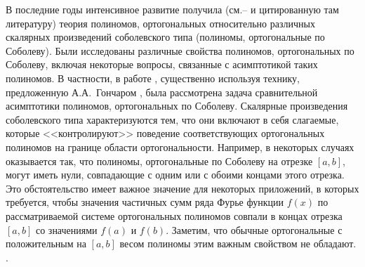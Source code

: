 В последние годы интенсивное развитие получила (см.\cite{sob-jac-discrete-IserKoch}--\cite{sob-jac-discrete-MarcelXu} и цитированную там литературу) теория полиномов, ортогональных относительно различных скалярных произведений соболевского типа (полиномы, ортогональные по Соболеву).
Были исследованы различные свойства полиномов, ортогональных по Соболеву, включая некоторые вопросы, связанные с асимптотикой таких полиномов. В частности, в работе \cite{sob-jac-discrete-Lopez1995}, существенно используя технику, предложенную А.А.~Гончаром \cite{sob-jac-discrete-Gonchar1975}, была рассмотрена задача сравнительной асимптотики полиномов, ортогональных по Соболеву.
Скалярные произведения соболевского типа характеризуются тем, что они включают в себя слагаемые, которые <<контролируют>> поведение соответствующих ортогональных полиномов на границе области ортогональности. Например, в некоторых случаях оказывается так, что полиномы, ортогональные по Соболеву на отрезке $[a,b]$, могут иметь нули, совпадающие с одним или с обоими концами этого отрезка. Это обстоятельство имеет важное значение для некоторых приложений, в которых требуется, чтобы значения  частичных сумм ряда Фурье функции $f(x)$ по рассматриваемой системе ортогональных полиномов совпали в концах отрезка $[a,b]$ со значениями $f(a)$ и $f(b)$. Заметим, что обычные ортогональные с положительным на  $[a,b]$ весом полиномы этим важным свойством не обладают. \cite{sob-jac-discrete-Lopez1995,sob-jac-discrete-Gonchar1975}.

